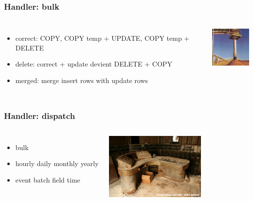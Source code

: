 \documentclass{beamer}
\begin{document}
\begin{frame}[fragile]
  \frametitle{Handler: bulk}

  \vfill
  
\begin{columns}[c]

  \begin{itemize}
    \item correct: COPY, COPY temp + UPDATE, COPY temp + DELETE
    \item delete: correct + update devient DELETE + COPY
    \item merged: merge insert rows with update rows
  \end{itemize}

\begin{center}
  \includegraphics[height=6em]{2bulk-loading-spout-250x250.jpg}
\end{center}
\end{columns}
\end{frame}

\begin{frame}[fragile]
  \frametitle{Handler: dispatch}

  \vfill

\begin{columns}[c]

  \begin{itemize}
    \item bulk
    \item hourly daily monthly yearly
    \item event batch field time
  \end{itemize}

\begin{center}
  \includegraphics[height=9em]{BCT_DispatcherDesk_Large.jpg}
\end{center}
\end{columns}
\end{frame}
\end{document}
